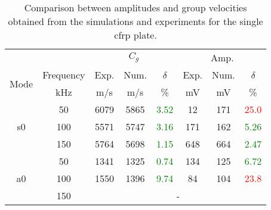 \begin{table}[ht]
	\small
	\tabcolsep=0.2cm
	\centering
	\caption{\label{tab:group_velocity_cfrp} Comparison between amplitudes and group velocities obtained from the simulations and experiments for the single \acf{cfrp} plate.}
	\begin{tabular}{cccccccc}
		\toprule
		& & \multicolumn{3}{c}{\(C_g\)} & \multicolumn{3}{c}{Amp.}\\
		\multirow{2}{*}{Mode} & Frequency & Exp. & Num. & \(\delta\)& Exp. & Num. & \(\delta\)\\
		& \unit{\kHz} & \unit[per-mode = symbol]{\m\per\s} & \unit[per-mode = symbol]{\m\per\s} & \% & \unit{\mV} & \unit{\mV} & \% \\
		\midrule
		\multirow{3}{*}{\ac{s0}} & 50 & 6079 & 5865 & \textcolor{green}{3.52}& 12 & 171 & \textcolor{red}{25.0} \\
		&100& 5571 & 5747 & \textcolor{green}{3.16} & 171 & 162 & \textcolor{green}{5.26}\\
		&150& 5764 & 5698 & \textcolor{green}{1.15} & 648 & 664 & \textcolor{green}{2.47}\\
		\midrule
		\multirow{3}{*}{\ac{a0}} &50& 1341 & 1325 & \textcolor{green}{0.74} & 134 & 125 & \textcolor{green}{6.72}\\
		&100& 1550 & 1396 & \textcolor{green}{9.74} & 84 & 104 & \textcolor{red}{23.8}\\
		&150& \multicolumn{6}{c}{-} \\
		\bottomrule
	\end{tabular}
\end{table}
